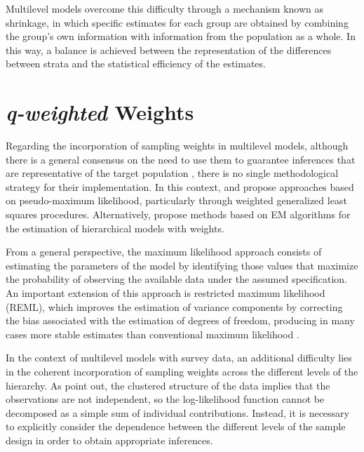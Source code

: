\documentclass[
  english,
  12pt,
]{book}
\begin{document}
Multilevel models overcome this difficulty through a mechanism known as shrinkage, in which specific estimates for each group are obtained by combining the group's own information with information from the population as a whole. In this way, a balance is achieved between the representation of the differences between strata and the statistical efficiency of the estimates.

\section{\texorpdfstring{\emph{q-weighted} Weights}{q-weighted Weights}}\label{pesos-q-weighted}

Regarding the incorporation of sampling weights in multilevel models, although there is a general consensus on the need to use them to guarantee inferences that are representative of the target population \citep{cai2013investigation}, there is no single methodological strategy for their implementation. In this context, \citet{pfeffermann1998weighting} and \citet{asparouhov2006general} propose approaches based on pseudo-maximum likelihood, particularly through weighted generalized least squares procedures. Alternatively, \citet{rabehesketh2006multilevel} propose methods based on EM algorithms for the estimation of hierarchical models with weights.

From a general perspective, the maximum likelihood approach consists of estimating the parameters of the model by identifying those values that maximize the probability of observing the available data under the assumed specification. An important extension of this approach is restricted maximum likelihood (REML), which improves the estimation of variance components by correcting the bias associated with the estimation of degrees of freedom, producing in many cases more stable estimates than conventional maximum likelihood \citep{kreft1998introducing}.

In the context of multilevel models with survey data, an additional difficulty lies in the coherent incorporation of sampling weights across the different levels of the hierarchy. As \citet{pfeffermann1998weighting} point out, the clustered structure of the data implies that the observations are not independent, so the log-likelihood function cannot be decomposed as a simple sum of individual contributions. Instead, it is necessary to explicitly consider the dependence between the different levels of the sample design in order to obtain appropriate inferences.
\end{document}
